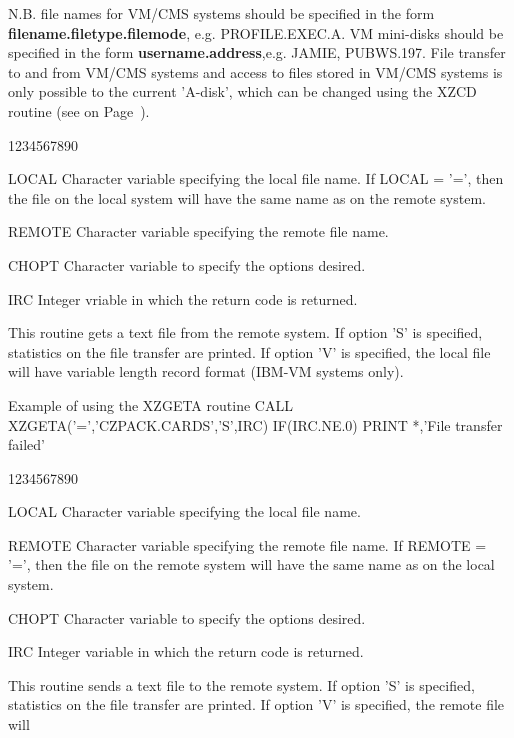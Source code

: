 \par
N.B. file names for VM/CMS systems should be specified in
the form {\bf filename.filetype\lsb .filemode\rsb }, e.g.
PROFILE.EXEC.A. VM mini-disks should be specified in the form
{\bf \lsb username\lsb .address\rsb \rsb },e.g.
\lsb JAMIE\rsb , \lsb PUBWS.197\rsb .
File transfer to and from VM/CMS systems and access to files
stored in VM/CMS systems is only possible to the current 'A-disk',
which can be changed using the XZCD routine (see on Page~\pageref{XZCD}).
\begin{DLtt}{1234567890}
\item[LOCAL]Character variable specifying the local file name.
If LOCAL = '=', then the file on the local system will
have the same name as on the remote system.
\item[REMOTE]Character variable specifying the remote file name.
\item[CHOPT]Character variable to specify the options desired.
\item[IRC]Integer vriable in which the return code is returned.
\end{DLtt}
\par
This routine gets a text file from the remote system.
If option 'S' is specified, statistics on the file transfer
are printed. If option 'V' is specified, the local file will
have variable length record format (IBM-VM systems only).
\begin{XMPt}{Example of using the XZGETA routine}
      CALL XZGETA('=','CZPACK.CARDS','S',IRC)
      IF(IRC.NE.0) PRINT *,'File transfer failed'
\end{XMPt}
\begin{DLtt}{1234567890}
\item[LOCAL]Character variable specifying the local file name.
\item[REMOTE]Character variable specifying the remote file name.
If REMOTE = '=', then the file on the remote system will
have the same name as on the local system.
\item[CHOPT]Character variable to specify the options desired.
\item[IRC]Integer variable in which the return code is returned.
\end{DLtt}
\par
This routine sends a text file to the remote system.
If option 'S' is specified, statistics on the file transfer
are printed. If option 'V' is specified, the remote file will
